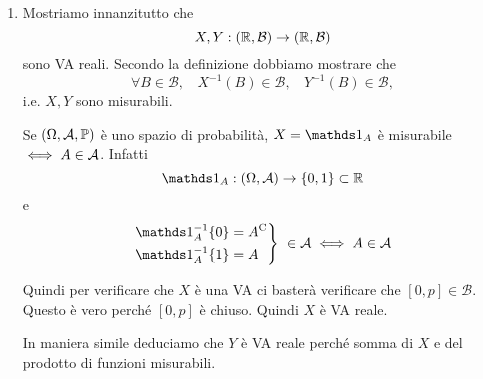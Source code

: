\ParteSoluzioni

\Soluzione

\begin{enumerate}
\item Mostriamo innanzitutto che
\begin{equation*}
X,Y:(\mathbb{R} ,\mathcal{B})\rightarrow (\mathbb{R} ,\mathcal{B})
\end{equation*}
sono VA reali. Secondo la definizione dobbiamo mostrare che
\begin{equation*}
\forall B\in \mathcal{B} ,\ \ \ \ X^{-1}(B) \in \mathcal{B} ,\ \ \ \ Y^{-1}(B) \in \mathcal{B} ,
\end{equation*}
i.e. $X,Y$ sono misurabili.
\begin{oss}
Se $(\Omega,\mathcal{A},\mathbb{P})$ è uno spazio di probabilità, $X=\Ind_{A}$ è misurabile $\iff A\in \mathcal{A}$. Infatti
\begin{equation*}
\Ind_{A} :(\Omega ,\Ac)\rightarrow \{0,1\} \subset \RR
\end{equation*}
e
\begin{equation*}
\begin{drcases}
\Ind_{A}^{-1}\{0\} =A\comp\\
\Ind_{A}^{-1}\{1\} =A
\end{drcases}
\ \in \Ac \iff A\in \Ac
\end{equation*}
\end{oss}

Quindi per verificare che $X$ è una VA ci basterà verificare che $[0,p] \in \mathcal{B}$. Questo è vero perché $[0,p]$ è chiuso. Quindi $X$ è VA reale.

In maniera simile deduciamo che $Y$ è VA reale perché somma di $X$ e del prodotto di funzioni misurabili.


\end{enumerate}
